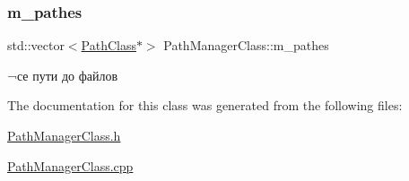 \subsubsection{\texorpdfstring{m\+\_\+pathes}{m\_pathes}}
{\footnotesize\ttfamily std\+::vector$<$\hyperlink{class_path_class}{Path\+Class}$\ast$$>$ Path\+Manager\+Class\+::m\+\_\+pathes\hspace{0.3cm}{\ttfamily [private]}}



¬се пути до файлов 



The documentation for this class was generated from the following files\+:\begin{DoxyCompactItemize}
\item 
\hyperlink{_path_manager_class_8h}{Path\+Manager\+Class.\+h}\item 
\hyperlink{_path_manager_class_8cpp}{Path\+Manager\+Class.\+cpp}\end{DoxyCompactItemize}
